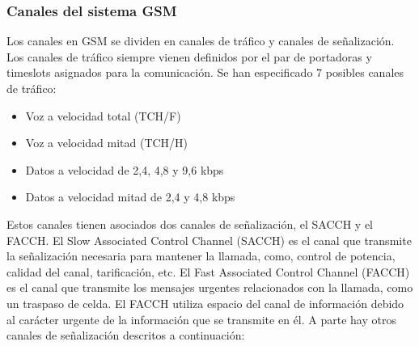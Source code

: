 \subsubsection{Canales del sistema GSM}
\label{ssub:canalesGSM}
Los canales en GSM se dividen en canales de tráfico y canales de señalización. Los canales de tráfico siempre vienen definidos por el par de portadoras y timeslots asignados para la comunicación. Se han especificado 7 posibles canales de tráfico:
\begin{itemize}
	\item Voz a velocidad total (TCH/F)
	\item Voz a velocidad mitad (TCH/H)
	\item Datos a velocidad de 2,4, 4,8 y 9,6 kbps
	\item Datos a velocidad mitad de 2,4 y 4,8 kbps
\end{itemize}
Estos canales tienen asociados dos canales de señalización, el SACCH y el FACCH. El Slow Associated Control Channel (SACCH) es el canal que transmite la señalización necesaria para mantener la llamada, como, control de potencia, calidad del canal, tarificación, etc. El Fast Associated Control Channel (FACCH) es el canal que transmite los mensajes urgentes relacionados con la llamada, como un traspaso de celda. El FACCH utiliza espacio del canal de información debido al carácter urgente de la información que se transmite en él. A parte hay otros canales de señalización descritos a continuación:
